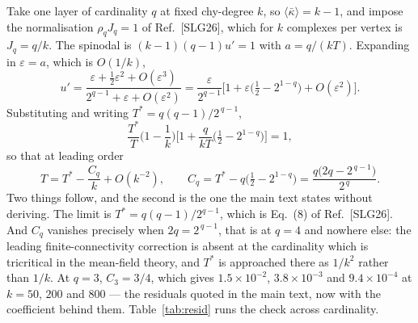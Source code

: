 \documentclass[aps,pre,onecolumn,superscriptaddress,floatfix,nofootinbib]{revtex4-2}
\newcommand{\ave}[1]{\langle #1 \rangle}
\newcommand{\kbar}{\bar\kappa}
\begin{document}
Take one layer of cardinality $q$ at fixed chy-degree $k$, so
$\ave{\kbar}=k-1$, and impose the normalisation $\rho_qJ_q=1$ of
Ref.~[SLG26], which for $k$ complexes per vertex is $J_q=q/k$. The spinodal is
$(k-1)(q-1)u'=1$ with $a=q/(kT)$. Expanding in $\varepsilon=a$, which is $O(1/k)$,
\begin{equation}
  u'=\frac{\varepsilon+\tfrac12\varepsilon^{2}+O(\varepsilon^{3})}
          {2^{q-1}+\varepsilon+O(\varepsilon^{2})}
    =\frac{\varepsilon}{2^{q-1}}
     \Big[1+\varepsilon\big(\tfrac12-2^{1-q}\big)+O(\varepsilon^{2})\Big].
\end{equation}
Substituting and writing $T^{\ast}=q(q-1)/2^{\,q-1}$,
\begin{equation}
  \frac{T^{\ast}}{T}\Big(1-\frac1k\Big)
  \Big[1+\frac{q}{kT}\big(\tfrac12-2^{1-q}\big)\Big]=1 ,
\end{equation}
so that at leading order
\begin{equation}
  T=T^{\ast}-\frac{C_q}{k}+O(k^{-2}),
  \qquad
  C_q=T^{\ast}-q\big(\tfrac12-2^{1-q}\big)
     =\frac{q\big(2q-2^{\,q-1}\big)}{2^{\,q}} .
  \label{eq:residual}
\end{equation}
Two things follow, and the second is the one the main text states without
deriving. The limit is $T^{\ast}=q(q-1)/2^{q-1}$, which is Eq.~(8) of
Ref.~[SLG26]. And $C_q$ vanishes precisely when $2q=2^{\,q-1}$, that is at
$q=4$ and nowhere else: the leading finite-connectivity correction is absent at
the cardinality which is tricritical in the mean-field theory, and $T^\ast$ is
approached there as $1/k^{2}$ rather than $1/k$. At $q=3$, $C_3=3/4$, which
gives $1.5\times10^{-2}$, $3.8\times10^{-3}$ and $9.4\times10^{-4}$ at $k=50$,
$200$ and $800$ --- the residuals quoted in the main text, now with the
coefficient behind them. Table~\ref{tab:resid} runs the check across
cardinality.
\end{document}
